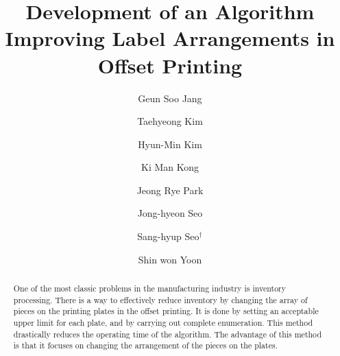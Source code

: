 \documentclass[a4paper]{amsart}
\title[Development of an Algorithm Improving Label Arrangements]{Development of an Algorithm Improving Label Arrangements in Offset Printing}
\author[G. S. Jang]{Geun Soo Jang}
\author[T. H. Kim]{Taehyeong Kim}
\author[H.-M. Kim]{Hyun-Min Kim}
\author[K. M. Kong]{Ki Man Kong}
\author[J. R. Park]{Jeong Rye Park}
\author[J.-H. Seo]{Jong-hyeon Seo}
\author[S.-H. Seo]{Sang-hyup Seo$^{\dagger}$}
\author[S. W. Yoon]{Shin won Yoon}
\numberwithin{equation}{section} %
\numberwithin{figure}{section} %
\numberwithin{table}{section}
\theoremstyle{plain}
\theoremstyle{definition}
\theoremstyle{plain}
\theoremstyle{plain}
\theoremstyle{plain}
\theoremstyle{plain}
\theoremstyle{plain}
\begin{document}
\begin{abstract}
One of the most classic problems in the manufacturing industry is inventory processing. 
There is a way to effectively reduce inventory by 
changing the array of pieces on the printing plates in the offset printing. 
It is done by setting an acceptable upper limit for each plate, and by carrying out complete enumeration. 
This method drastically reduces the operating time of the algorithm. 
The advantage of this method is that it focuses on changing the arrangement of the pieces on the plates.
\end{abstract}

\maketitle

\end{document}
